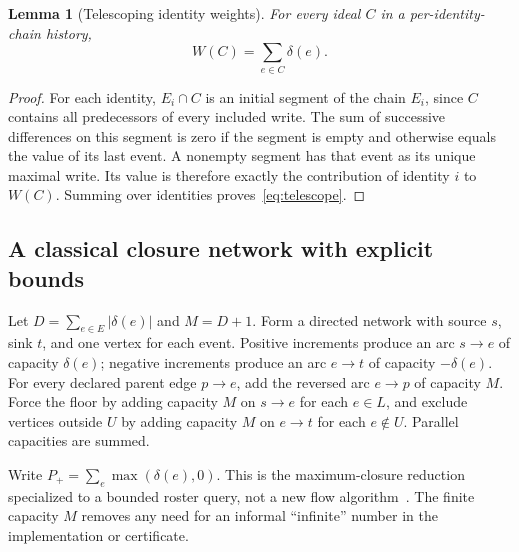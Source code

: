 \documentclass[11pt]{article}
\newtheorem{lemma}[theorem]{Lemma}
\theoremstyle{definition}
\begin{document}
\begin{lemma}[Telescoping identity weights]\label{lem:telescope}
For every ideal $C$ in a per-identity-chain history,
\begin{equation}\label{eq:telescope}
 W(C)=\sum_{e\in C}\delta(e).
\end{equation}
\end{lemma}
\begin{proof}
For each identity, $E_i\cap C$ is an initial segment of the chain $E_i$, since $C$ contains all predecessors of every included write. The sum of successive differences on this segment is zero if the segment is empty and otherwise equals the value of its last event. A nonempty segment has that event as its unique maximal write. Its value is therefore exactly the contribution of identity $i$ to $W(C)$. Summing over identities proves~\eqref{eq:telescope}.
\end{proof}

\subsection{A classical closure network with explicit bounds}
Let $D=\sum_{e\in E}|\delta(e)|$ and $M=D+1$. Form a directed network with source $s$, sink $t$, and one vertex for each event. Positive increments produce an arc $s\to e$ of capacity $\delta(e)$; negative increments produce an arc $e\to t$ of capacity $-\delta(e)$. For every declared parent edge $p\to e$, add the reversed arc $e\to p$ of capacity $M$. Force the floor by adding capacity $M$ on $s\to e$ for each $e\in L$, and exclude vertices outside $U$ by adding capacity $M$ on $e\to t$ for each $e\notin U$. Parallel capacities are summed.

Write $P_+=\sum_e\max(\delta(e),0)$. This is the maximum-closure reduction specialized to a bounded roster query, not a new flow algorithm~\cite{picard1976closure}. The finite capacity $M$ removes any need for an informal ``infinite'' number in the implementation or certificate.
\end{document}
